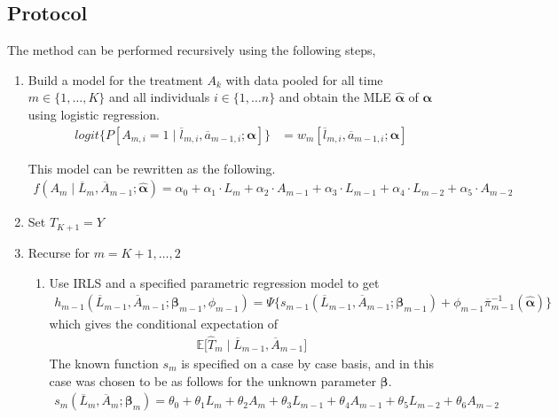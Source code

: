 \subsection{Protocol} 
The method can be performed recursively using the following steps, 

\begin{enumerate}
\item Build a model for the treatment $A_k$ with data pooled for all time $m \in \{1, \dots, K \}$ and all individuals $i \in \{1, \dots n\}$ and obtain the MLE $\hat{\mathbf{\alpha}}$ of $\mathbf{\alpha}$ using logistic regression. 
\begin{align} 
logit\{P[A_{m,i} = 1 \mid \overline{l}_{m,i}, \overline{a}_{m-1,i}; \mathbf{\alpha}]\} &= w_m [\overline{l}_{m,i}, \overline{a}_{m-1,i}; \mathbf{\alpha}]
\end{align} 

This model can be rewritten as the following.  
\begin{align} 
f(A_m \mid \overline{L}_m, \overline{A}_{m-1}; \hat{\mathbf{\alpha}}) = \alpha_{0} + \alpha_{1} \cdot L_{m} + \alpha_{2} \cdot A_{m-1} + \alpha_{3} \cdot L_{m-1} + \alpha_{4} \cdot L_{m-2} + \alpha_{5} \cdot A_{m-2} 
\end{align} 

\item Set $\hat{T}_{K+1} = Y$ 

\item Recurse for $m = K+1, \dots, 2$ 
\begin{enumerate}
\item \label{modcreate} Use IRLS and a specified parametric regression model to get
\begin{align}
h_{m-1}(\overline{L}_{m-1}, \overline{A}_{m-1}; \mathbf{\beta}_{m-1}, \phi_{m-1}) = \Psi \{s_{m-1}(\overline{L}_{m-1}, \overline{A}_{m-1}; \mathbf{\beta}_{m-1}) + \phi_{m-1} \overline{\pi}_{m-1}^{-1} (\hat{\mathbf{\alpha}}) \}
\end{align}
which gives the conditional expectation of 
\begin{align}
\mathbb{E} \bigg[\hat{T}_m \mid \overline{L}_{m-1}, \overline{A}_{m-1} \bigg]
\end{align} 
The known function $s_{m}$ is specified on a case by case basis, and in this case was chosen to be as follows for the unknown parameter $\mathbf{\beta}$.  
\begin{align}
s_{m}(\overline{L}_{m}, \overline{A}_{m};\mathbf{\beta}_{m}) = \theta_0 + \theta_1 L_{m} +\theta_2 A_{m} + \theta_3 L_{m-1} +\theta_4 A_{m-1}+ \theta_5 L_{m-2} +\theta_6 A_{m-2}
\end{align}


\end{enumerate}
\end{enumerate}
